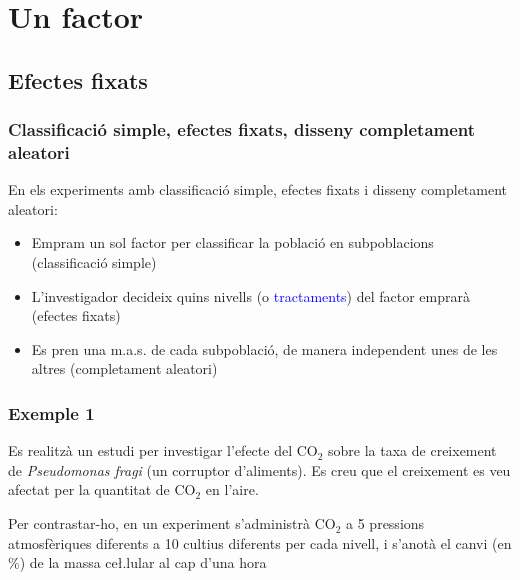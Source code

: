 \documentclass[12pt,t]{beamer}
\newcommand{\blue}[1]{\textcolor{blue}{#1}}
\renewcommand{\emph}[1]{{\color{red}#1}}
\theoremstyle{plain}
\theoremstyle{definition}
\begin{document}
\section{Un factor}
\subsection{Efectes fixats}


\begin{frame}
\frametitle{Classificació simple, efectes fixats, disseny completament aleatori
}

En els experiments amb \emph{classificació simple, efectes fixats i disseny completament aleatori}:
\begin{itemize}
\item Empram un sol factor per classificar la població en subpoblacions (\emph{classificació simple})
\medskip

\item L'investigador decideix quins nivells (o \blue{tractaments}) del factor emprarà (\emph{efectes fixats})
\medskip

\item Es pren una m.a.s. de cada subpoblació,  de manera independent unes de les altres (\emph{completament aleatori})
\end{itemize}
\end{frame}


\begin{frame}
\frametitle{Exemple 1}
Es realitzà un estudi per investigar l'efecte del
CO${}_2$ sobre la taxa de creixement de {\it Pseudomonas fragi} (un corruptor d'aliments). 
Es creu que el creixement es veu afectat per la quantitat de CO${}_2$ en l'aire.
\medskip

Per contrastar-ho, en un experiment s'administrà CO${}_2$ a 5 pressions atmosfèriques
diferents a 10 cultius diferents per cada nivell, i s'anotà el canvi (en \%) de la massa ce\l.lular
al cap d'una hora

\end{frame}
\end{document}
